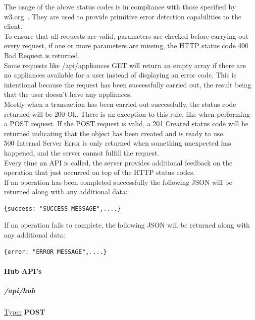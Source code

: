 \documentclass[draft,preprint,12pt,3p]{elsarticle}
\begin{document}
The usage of the above status codes is in compliance with those specified by w3.org~\cite{w3}. They are used to provide primitive error detection capabilities to the client.\\
To ensure that all requests are valid, parameters are checked before carrying out every request, if one or more parameters are missing, the HTTP status code 400 Bad Request is returned.\\
Some requests like /api/appliances GET will return an empty array if there are no appliances available for a user instead of displaying an error code. This is intentional because the request has been successfully carried out, the result being that the user doesn't have any appliances.\\
Mostly when a transaction has been carried out successfully, the status code returned will be 200 Ok. There is an exception to this rule, like when performing a POST request. If the POST request is valid, a 201 Created status code will be returned indicating that the object has been created and is ready to use.\\
500 Internal Server Error is only returned when something unexpected has happened, and the server cannot fulfill the request.\\
Every time an API is called, the server provides additional feedback on the operation that just occurred on top of the HTTP status codes.\\
If an operation has been completed successfully the following JSON will be returned along with any additional data:\\[5pt]
\begin{verbatim}
{success: "SUCCESS MESSAGE",....}
\end{verbatim}

If an operation fails to complete, the following JSON will be returned along with any additional data:\\[5pt]
\begin{verbatim}
{error: "ERROR MESSAGE",....}
\end{verbatim}


\paragraph{Hub API's}
\subparagraph*{/api/hub}
\underline{Type:} \textbf{POST}\\
\end{document}

